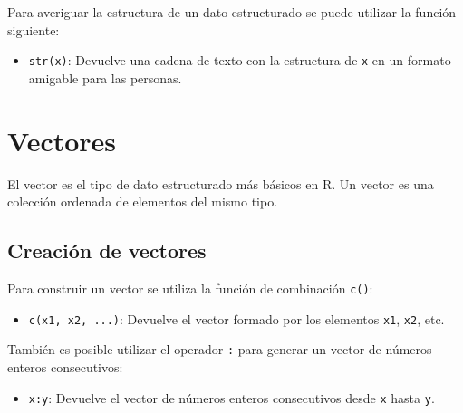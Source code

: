 \documentclass[
  a4paper,
]{scrreport}
\providecommand{\tightlist}{%
  \setlength{\itemsep}{0pt}\setlength{\parskip}{0pt}}\usepackage{longtable,booktabs,array}
\theoremstyle{definition}
\theoremstyle{definition}
\theoremstyle{remark}
\begin{document}
Para averiguar la estructura de un dato estructurado se puede utilizar
la función siguiente:

\begin{itemize}
\tightlist
\item
  \texttt{str(x)}: Devuelve una cadena de texto con la estructura de
  \texttt{x} en un formato amigable para las personas.
\end{itemize}

\hypertarget{vectores}{%
\section{Vectores}\label{vectores}}

El vector es el tipo de dato estructurado más básicos en R. Un vector es
una colección ordenada de elementos del mismo tipo.

\hypertarget{creaciuxf3n-de-vectores}{%
\subsection{Creación de vectores}\label{creaciuxf3n-de-vectores}}

Para construir un vector se utiliza la función de combinación
\texttt{c()}:

\begin{itemize}
\tightlist
\item
  \texttt{c(x1,\ x2,\ ...)}: Devuelve el vector formado por los
  elementos \texttt{x1}, \texttt{x2}, etc.
\end{itemize}

También es posible utilizar el operador \texttt{:} para generar un
vector de números enteros consecutivos:

\begin{itemize}
\tightlist
\item
  \texttt{x:y}: Devuelve el vector de números enteros consecutivos desde
  \texttt{x} hasta \texttt{y}.
\end{itemize}
\end{document}
